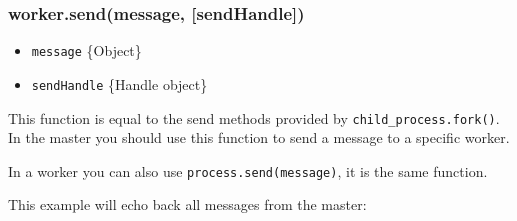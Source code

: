 \begin{Shaded}
\begin{Highlighting}[]
\NormalTok{(}\NormalTok{, }
   \NormalTok{(} \NormalTok{=== }\NormalTok{) \{}
    \NormalTok{(}
  \NormalTok{\}}
\NormalTok{\});}

\NormalTok{();}
\end{Highlighting}
\end{Shaded}

\subsubsection{worker.send(message,
{[}sendHandle{]})}\label{worker.sendmessage-sendhandle}

\begin{itemize}
\itemsep1pt\parskip0pt
\item
  \texttt{message} \{Object\}
\item
  \texttt{sendHandle} \{Handle object\}
\end{itemize}

This function is equal to the send methods provided by
\texttt{child\_process.fork()}. In the master you should use this
function to send a message to a specific worker.

In a worker you can also use \texttt{process.send(message)}, it is the
same function.

This example will echo back all messages from the master:

\begin{Shaded}
\begin{Highlighting}[]
 \NormalTok{(}\NormalTok{) \{}
   \NormalTok{();}
  \NormalTok{(}\NormalTok{);}

\NormalTok{\} }  \NormalTok{(}\NormalTok{) \{}
  \NormalTok{(}\NormalTok{, }
  \NormalTok{\});}
\NormalTok{\}}
\end{Highlighting}
\end{Shaded}

